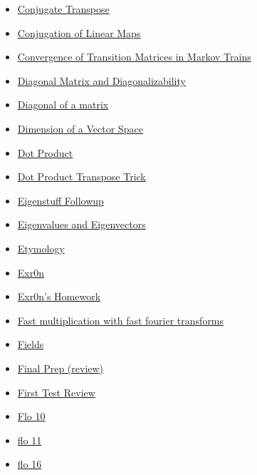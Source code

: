 \documentclass[11pt]{article}
\begin{document}
\begin{itemize}
\begin{itemize}
\begin{itemize}
\item \href{mathematics/linear\_algebra/KBrefConjugateTranspose.org}{Conjugate Transpose}
\item \href{mathematics/linear\_algebra/KBrefLinearMapConjugation.org}{Conjugation of Linear Maps}
\item \href{mathematics/linear\_algebra/ConvergenceOfMarkovTransitionMatrices.org}{Convergence of Transition Matrices in Markov Trains}
\item \href{mathematics/linear\_algebra/KBrefDiagonalMatrix.org}{Diagonal Matrix and Diagonalizability}
\item \href{mathematics/linear\_algebra/KBrefDiagonalOfAMatrix.org}{Diagonal of a matrix}
\item \href{mathematics/linear\_algebra/KBrefDimension.org}{Dimension of a Vector Space}
\item \href{mathematics/linear\_algebra/KBrefDotProduct.org}{Dot Product}
\item \href{mathematics/linear\_algebra/KBrefDotProductTranspose.org}{Dot Product Transpose Trick}
\item \href{mathematics/linear\_algebra/KBe21math530retEigenstuffFollowup.org}{Eigenstuff Followup}
\item \href{mathematics/linear\_algebra/KBrefEigenvaluesAndEigenVectors.org}{Eigenvalues and Eigenvectors}
\item \href{mathematics/linear\_algebra/KBe2020math530floLinalgEtymology.org}{Etymology}
\item \href{mathematics/linear\_algebra/KBe20math530flo12.org}{Exr0n}
\item \href{mathematics/linear\_algebra/KBe2020math530refExr0nRetIndex.org}{Exr0n's Homework}
\item \href{mathematics/linear\_algebra/KBe21math530floFastMultiplicationWithFFT.org}{Fast multiplication with fast fourier transforms}
\item \href{mathematics/linear\_algebra/KBe20math530refField.org}{Fields}
\item \href{mathematics/linear\_algebra/KBe20math530refFallFinalPrep.org}{Final Prep (review)}
\item \href{mathematics/linear\_algebra/KBxFirstTestReview.org}{First Test Review}
\item \href{mathematics/linear\_algebra/KBe20math530flo10.org}{Flo 10}
\item \href{mathematics/linear\_algebra/KBe20math530flo11.org}{flo 11}
\item \href{mathematics/linear\_algebra/KBe20math530flo16.org}{flo 16}

\end{itemize}
\end{itemize}
\end{itemize}
\end{document}
